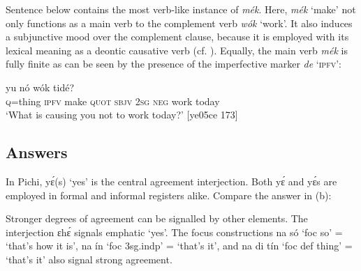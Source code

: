 Sentence  below contains the most verb-like instance of \textit{mék}. Here, \textit{mék} ‘make’ not only functions as a main verb to the complement verb \textit{wók} ‘work’. It also induces a subjunctive mood over the complement clause, because it is employed with its lexical meaning as a deontic causative verb (cf. ). Equally, the main verb \textit{mék} is fully finite as can be seen by the presence of the imperfective marker \textit{de} ‘\textsc{ipfv}’:


\ea%
    \label{ex:key:649}
    \gll {}               yu  nó  wók    tidé?\\
\textsc{q}=thing  \textsc{ipfv}  make  \textsc{quot}    \textsc{sbjv}    \textsc{2sg}  \textsc{neg}  work  today\\

\glt ‘What is causing you not to work today?’ [ye05ce 173]
\z

\subsection{Answers}\label{sec:7.3.3}

In Pichi, yɛ́(s) ‘yes’ is the central agreement interjection. Both yɛ́ and yɛ́s are employed in formal and informal registers alike. Compare the answer in (b):


\ea%
    \label{ex:key:650}
\z
\z

Stronger degrees of agreement can be signalled by other elements. The interjection ɛhɛ́ signals emphatic ‘yes’. The focus constructions na só ‘foc so’ = ‘that’s how it is’, na ín ‘foc 3sg.indp’ = ‘that’s it’, and na di tín ‘foc def thing’ = ‘that’s it’ also signal strong agreement. 


